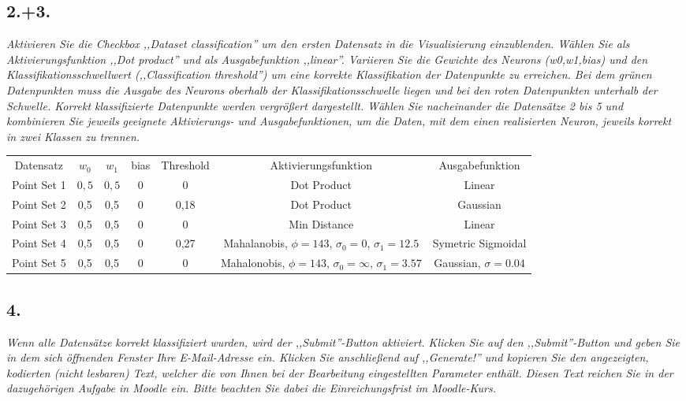 \documentclass[a4paper,10pt,titlepage]{scrartcl}
\begin{document}
\subsection*{2.+3.}
\textit{Aktivieren Sie die Checkbox ,,Dataset classification'' um den ersten Datensatz in die Visualisierung einzublenden. Wählen Sie als Aktivierungsfunktion ,,Dot product'' und als Ausgabefunktion ,,linear''. Variieren Sie die Gewichte des Neurons (w0,w1,bias) und den Klassifikationsschwellwert (,,Classification threshold'') um eine korrekte Klassifikation der Datenpunkte zu erreichen. Bei dem grünen Datenpunkten muss die Ausgabe des Neurons oberhalb der Klassifikationsschwelle liegen und bei den roten Datenpunkten unterhalb der Schwelle. Korrekt klassifizierte Datenpunkte werden vergrößert dargestellt. Wählen Sie nacheinander die Datensätze 2 bis 5 und kombinieren Sie jeweils geeignete Aktivierungs- und Ausgabefunktionen, um die Daten, mit dem einen realisierten Neuron, jeweils korrekt in zwei Klassen zu trennen.}

\begin{tabular}{c|c|c|c|c|c|c}
    Datensatz   & $w_0$ & $w_1$ & bias & Threshold & Aktivierungsfunktion                                        & Ausgabefunktion         \\
    Point Set 1 & $0,5$ & $0,5$ & $0$  & $0$       & Dot Product                                                 & Linear                  \\
    Point Set 2 & 0,5   & 0,5   & 0    & 0,18      & Dot Product                                                 & Gaussian                \\
    Point Set 3 & 0,5   & 0,5   & 0    & 0         & Min Distance                                                & Linear                  \\
    Point Set 4 & 0,5   & 0,5   & 0    & 0,27      & Mahalanobis, $\phi=143$, $\sigma_0=0$, $\sigma_1=12.5$      & Symetric Sigmoidal      \\
    Point Set 5 & 0,5   & 0,5   & 0    & 0         & Mahalonobis, $\phi=143$, $\sigma_0=\infty$, $\sigma_1=3.57$ & Gaussian, $\sigma=0.04$ \\
\end{tabular}


\subsection*{4.}
\textit{Wenn alle Datensätze korrekt klassifiziert wurden, wird der ,,Submit''-Button aktiviert. Klicken Sie auf den ,,Submit''-Button und geben Sie in dem sich öffnenden Fenster Ihre E-Mail-Adresse ein. Klicken Sie anschließend auf ,,Generate!'' und kopieren Sie den angezeigten, kodierten (nicht lesbaren) Text, welcher die von Ihnen bei der Bearbeitung eingestellten Parameter enthält. Diesen Text reichen Sie in der dazugehörigen Aufgabe in Moodle ein. Bitte beachten Sie dabei die Einreichungsfrist im Moodle-Kurs.}
\end{document}

